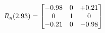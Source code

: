 \documentclass[preview]{standalone}
\begin{document}
\begin{align*}
\special{dvisvgm:raw <g id='unique000'>}R_{y}(2.93) = \begin{bmatrix}-0.98 & 0 & +0.21 \\0 & 1 & 0 \\-0.21 & 0 & -0.98\end{bmatrix}\special{dvisvgm:raw </g>}
\end{align*}
\end{document}
